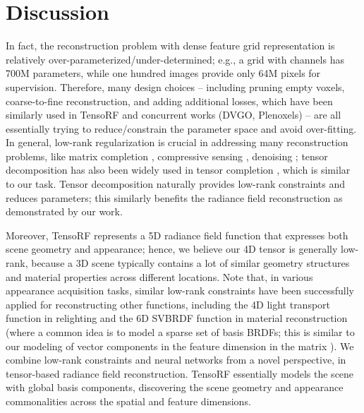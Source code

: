 \documentclass[runningheads]{llncs}
\begin{document}
\section{Discussion}

In fact, the reconstruction problem with dense feature grid representation is relatively over-parameterized/under-determined; e.g., a  grid with  channels has 700M parameters, while one hundred  images provide only 64M pixels for supervision.
Therefore, many design choices -- including pruning empty voxels, coarse-to-fine reconstruction, and adding additional losses, which have been similarly used in TensoRF and concurrent works (DVGO, Plenoxels) -- are all essentially trying to reduce/constrain the parameter space and avoid over-fitting. 
In general, low-rank regularization is crucial in addressing many reconstruction problems, like matrix completion \cite{candes2010matrix}, compressive sensing \cite{dong2014compressive}, denoising \cite{ji2010robust};
tensor decomposition has also been widely used in tensor completion \cite{liu2012tensor,gandy2011tensor}, which is similar to our task. 
Tensor decomposition naturally provides low-rank constraints and reduces parameters; this similarly benefits the radiance field reconstruction as demonstrated by our work.

Moreover, TensoRF represents a 5D radiance field function that expresses both scene geometry and appearance;
hence, we believe our 4D tensor is generally low-rank, because a 3D scene typically contains a lot of similar geometry structures and material properties across different locations. 
Note that, in various appearance acquisition tasks, similar low-rank constraints have been successfully applied for reconstructing other functions, including the 4D light transport function in relighting \cite{wang2009kernel} and the 6D SVBRDF function in material reconstruction \cite{zhou2016sparse,nam2018practical} (where a common idea is to model a sparse set of basis BRDFs; this is similar to our modeling of vector components in the feature dimension in the matrix ).
We combine low-rank constraints and neural networks from a novel perspective, in tensor-based radiance field reconstruction.
TensoRF essentially models the scene with global basis components, discovering the scene geometry and appearance commonalities across the spatial and feature dimensions.
\end{document}
